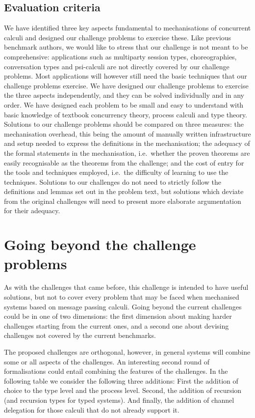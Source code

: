 \documentclass[runningheads]{llncs}
\begin{document}
\subsection{Evaluation criteria}
We have identified three key aspects fundamental to mechanisations of concurrent calculi and designed our challenge problems to exercise these.
Like previous benchmark authors, we would like to stress that our challenge is not meant to be comprehensive: applications such as multiparty session types, choreographies, conversation types and psi-calculi are not directly covered by our challenge problems.
Most applications will however still need the basic techniques that our challenge problems exercise.
We have designed our challenge problems to exercise the three aspects independently, and they can be solved individually and in any order.
We have designed each problem to be small and easy to understand with basic knowledge of textbook concurrency theory, process calculi and type theory.
Solutions to our challenge problems should be compared on three measures: the mechanisation overhead, this being the amount of manually written infrastructure and setup needed to express the definitions in the mechanisation; the adequacy of the formal statements in the mechanisation, i.e.\ whether the proven theorems are easily recognisable as the theorems from the challenge; and the cost of entry for the tools and techniques employed, i.e.\ the difficulty of learning to use the techniques.
Solutions to our challenges do not need to strictly follow the definitions and lemmas set out in the problem text, but solutions which deviate from the original challenges will need to present more elaborate argumentation for their adequacy.


\section{Going beyond the challenge problems}\label{sec:going-beyond}

As with the challenges that came before, this challenge is intended to
have useful solutions, but not to cover every problem that may be
faced when mechanised systems based on message passing calculi. Going
beyond the current challenges could be in one of two dimensions: the
first dimension about making harder challenges starting from the
current ones, and a second one about devising challenges not covered
by the current benchmarks.

The proposed challenges are orthogonal, however, in general systems
will combine some or all aspects of the challenges. An interesting
second round of formalisations could entail combining the features of
the challenges. In the following table we consider the following three
additions: First the addition of choice to the type level and the
process level. Second, the addition of recursion (and recursion types
for typed systems). And finally, the addition of channel delegation
for those calculi that do not already support it.
\end{document}
